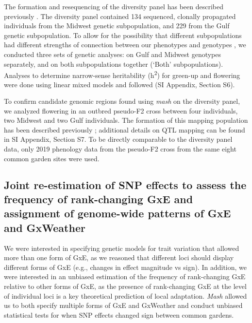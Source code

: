 \documentclass[
  9pt,
  twocolumn,
  twoside]{simple-article}%
\begin{document}
The formation and resequencing of the diversity panel has been described
previously \citet{lovell2021}. The diversity panel contained 134
sequenced, clonally propagated individuals from the Midwest genetic
subpopulation, and 229 from the Gulf genetic subpopulation. To allow for
the possibility that different subpopulations had different strengths of
connection between our phenotypes and genotypes \citep{kortefarlow2013},
we conducted three sets of genetic analyses: on Gulf and Midwest
genotypes separately, and on both subpopulations together (`Both'
subpopulations). Analyses to determine narrow-sense heritability
(h\textsuperscript{2}) for green-up and flowering were done using linear
mixed models and followed \citet{lovell2021} (SI Appendix, Section S6).

To confirm candidate genomic regions found using \emph{mash} on the
diversity panel, we analyzed flowering in an outbred pseudo-F2 cross
between four individuals, two Midwest and two Gulf individuals. The
formation of this mapping population has been described previously
\citep{milano2016genetic}; additional details on QTL mapping can be
found in SI Appendix, Section S7. To be directly comparable to the
diversity panel data, only 2019 phenology data from the pseudo-F2 cross
from the same eight common garden sites were used.

\subsection{Joint re-estimation of SNP effects to assess the frequency
of rank-changing GxE and assignment of genome-wide patterns of GxE and
GxWeather}\label{joint-re-estimation-of-snp-effects-to-assess-the-frequency-of-rank-changing-gxe-and-assignment-of-genome-wide-patterns-of-gxe-and-gxweather}

We were interested in specifying genetic models for trait variation that
allowed more than one form of GxE, as we reasoned that different loci
should display different forms of GxE (e.g., changes in effect magnitude
vs sign). In addition, we were interested in an unbiased estimation of
the frequency of rank-changing GxE relative to other forms of GxE, as
the presence of rank-changing GxE at the level of individual loci is a
key theoretical prediction of local adaptation. \emph{Mash} allowed us
to both specify multiple forms of GxE and GxWeather and conduct unbiased
statistical tests for when SNP effects changed sign between common
gardens.
\end{document}
